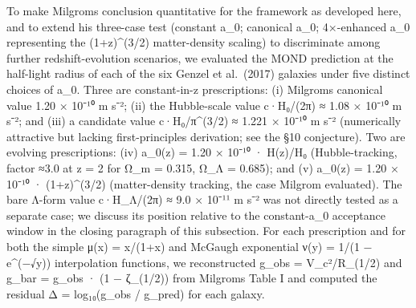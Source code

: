 \documentclass[11pt]{article}
\begin{document}
To make Milgrom\textquotesingle s conclusion quantitative for the framework as developed here, and to extend his three-case test (constant a\_0; canonical a\_0; 4×-enhanced a\_0 representing the (1+z)\^{}(3/2) matter-density scaling) to discriminate among further redshift-evolution scenarios, we evaluated the MOND prediction at the half-light radius of each of the six Genzel et al.~(2017) galaxies under five distinct choices of a\_0. Three are constant-in-z prescriptions: (i) Milgrom\textquotesingle s canonical value 1.20 × 10⁻¹⁰ m s⁻²; (ii) the Hubble-scale value c·H₀/(2π) ≈ 1.08 × 10⁻¹⁰ m s⁻²; and (iii) a candidate value c·H₀/π\^{}(3/2) ≈ 1.221 × 10⁻¹⁰ m s⁻² (numerically attractive but lacking first-principles derivation; see the §10 conjecture). Two are evolving prescriptions: (iv) a\_0(z) = 1.20 × 10⁻¹⁰ · H(z)/H₀ (Hubble-tracking, factor ≈3.0 at z = 2 for Ω\_m = 0.315, Ω\_Λ = 0.685); and (v) a\_0(z) = 1.20 × 10⁻¹⁰ · (1+z)\^{}(3/2) (matter-density tracking, the case Milgrom evaluated). The bare Λ-form value c·H\_Λ/(2π) ≈ 9.0 × 10⁻¹¹ m s⁻² was not directly tested as a separate case; we discuss its position relative to the constant-a\_0 acceptance window in the closing paragraph of this subsection. For each prescription and for both the simple μ(x) = x/(1+x) and McGaugh exponential ν(y) = 1/(1 − e\^{}(−√y)) interpolation functions, we reconstructed g\_obs = V\_c²/R\_(1/2) and g\_bar = g\_obs · (1 − ζ\_(1/2)) from Milgrom\textquotesingle s Table I and computed the residual Δ = log₁₀(g\_obs / g\_pred) for each galaxy.
\end{document}
